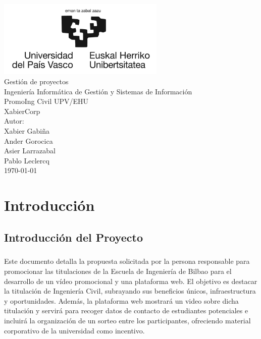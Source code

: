 \documentclass{report}
\begin{document}
    \begin{titlepage}
        \centering
        \includegraphics[width=0.6\textwidth]{./img/logo.jpg}\\
        \vspace{1cm}
        \LARGE Gestión de proyectos\\
        \vspace{0.5cm}
        \Large Ingeniería Informática de Gestión y Sistemas de Información\\
        \vspace{3cm}
        \Huge PromoIng Civil UPV/EHU\\
        \huge XabierCorp\\
        \vspace{2.5cm}
        \Large Autor:\\
        \vspace{0.2cm}
        \large Xabier Gabiña\\
        \large Ander Gorocica\\
        \large Asier Larrazabal\\
        \large Pablo Leclercq\\
        \vfill
        \today
    \end{titlepage}
    \tableofcontents
    \listoffigures
    \listoftables
    \chapter{Introducción}
        \section{Introducción del Proyecto}
            \paragraph*{}
            Este documento detalla la propuesta solicitada por la persona responsable para promocionar las titulaciones de la Escuela de Ingeniería de Bilbao para el desarrollo de un vídeo promocional y una plataforma web. El objetivo es destacar la titulación de Ingeniería Civil, subrayando sus beneficios únicos, infraestructura y oportunidades. Además, la plataforma web mostrará un video sobre dicha titulación y servirá para recoger datos de contacto de estudiantes potenciales e incluirá la organización de un sorteo entre los participantes, ofreciendo material corporativo de la universidad como incentivo.
\end{document}
